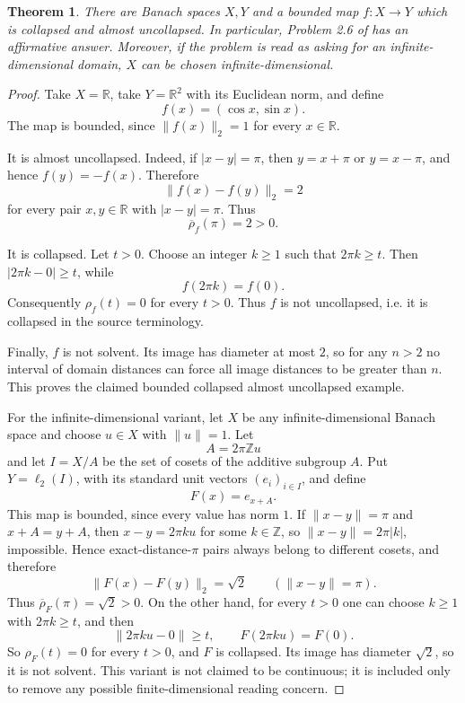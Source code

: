 \documentclass[11pt]{article}
\newtheorem{theorem}{Theorem}
\newcommand{\R}{\mathbb{R}}
\newcommand{\rhoinf}{\rho}
\newcommand{\rhobar}{\overline{\rho}}
\begin{document}
\begin{theorem}
There are Banach spaces \(X,Y\) and a bounded map \(f:X\to Y\) which is
collapsed and almost uncollapsed. In particular, Problem 2.6 of \cite{Braga}
has an affirmative answer. Moreover, if the problem is read as asking for an
infinite-dimensional domain, \(X\) can be chosen infinite-dimensional.
\end{theorem}

\begin{proof}
Take \(X=\R\), take \(Y=\R^2\) with its Euclidean norm, and define
\[
       f(x)=(\cos x,\sin x).
\]
The map is bounded, since \(\|f(x)\|_2=1\) for every \(x\in\R\).

It is almost uncollapsed. Indeed, if \(|x-y|=\pi\), then \(y=x+\pi\) or
\(y=x-\pi\), and hence \(f(y)=-f(x)\). Therefore
\[
       \|f(x)-f(y)\|_2=2
\]
for every pair \(x,y\in\R\) with \(|x-y|=\pi\). Thus
\[
       \rhobar_f(\pi)=2>0.
\]

It is collapsed. Let \(t>0\). Choose an integer \(k\geq1\) such that
\(2\pi k\geq t\). Then \(|2\pi k-0|\geq t\), while
\[
       f(2\pi k)=f(0).
\]
Consequently \(\rhoinf_f(t)=0\) for every \(t>0\). Thus \(f\) is not
uncollapsed, i.e. it is collapsed in the source terminology.

Finally, \(f\) is not solvent. Its image has diameter at most \(2\), so for
any \(n>2\) no interval of domain distances can force all image distances to
be greater than \(n\). This proves the claimed bounded collapsed almost
uncollapsed example.

For the infinite-dimensional variant, let \(X\) be any infinite-dimensional
Banach space and choose \(u\in X\) with \(\|u\|=1\). Let
\[
       A=2\pi\mathbb{Z}u
\]
and let \(I=X/A\) be the set of cosets of the additive subgroup \(A\). Put
\(Y=\ell_2(I)\), with its standard unit vectors \((e_i)_{i\in I}\), and define
\[
       F(x)=e_{x+A}.
\]
This map is bounded, since every value has norm \(1\). If \(\|x-y\|=\pi\) and
\(x+A=y+A\), then \(x-y=2\pi k u\) for some \(k\in\mathbb{Z}\), so
\(\|x-y\|=2\pi |k|\), impossible. Hence exact-distance-\(\pi\) pairs always
belong to different cosets, and therefore
\[
       \|F(x)-F(y)\|_2=\sqrt{2}
       \qquad(\|x-y\|=\pi).
\]
Thus \(\rhobar_F(\pi)=\sqrt{2}>0\). On the other hand, for every \(t>0\) one
can choose \(k\geq1\) with \(2\pi k\geq t\), and then
\[
       \|2\pi k u-0\|\geq t,\qquad F(2\pi k u)=F(0).
\]
So \(\rhoinf_F(t)=0\) for every \(t>0\), and \(F\) is collapsed. Its image
has diameter \(\sqrt{2}\), so it is not solvent. This variant is not claimed
to be continuous; it is included only to remove any possible finite-dimensional
reading concern.
\end{proof}
\end{document}
